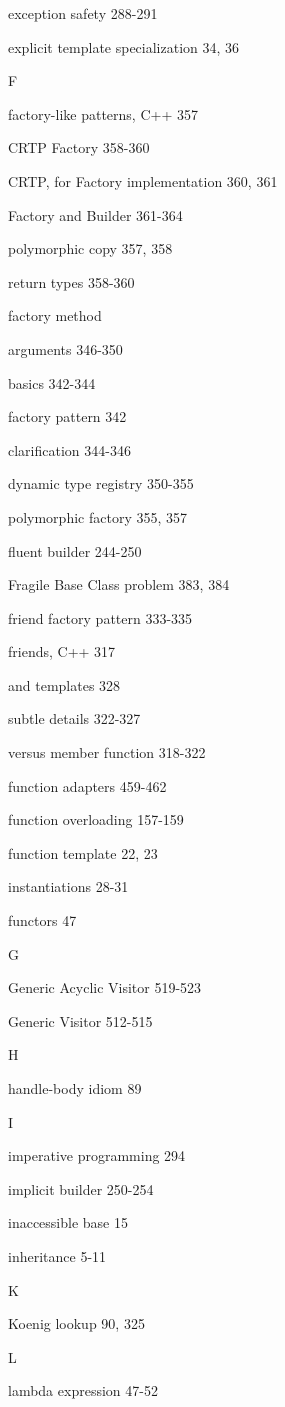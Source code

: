 exception safety 288-291

explicit template specialization 34, 36

F

factory-like patterns, C++ 357

CRTP Factory 358-360

CRTP, for Factory implementation 360, 361

Factory and Builder 361-364

polymorphic copy 357, 358

return types 358-360

factory method

arguments 346-350

basics 342-344

factory pattern 342

clarification 344-346

dynamic type registry 350-355

polymorphic factory 355, 357

fluent builder 244-250

Fragile Base Class problem 383, 384

friend factory pattern 333-335

friends, C++ 317

and templates 328

subtle details 322-327

versus member function 318-322

function adapters 459-462

function overloading 157-159

function template 22, 23

instantiations 28-31

functors 47

G

Generic Acyclic Visitor 519-523

Generic Visitor 512-515

H

handle-body idiom 89

I

imperative programming 294

implicit builder 250-254

inaccessible base 15

inheritance 5-11

K

Koenig lookup 90, 325

L

lambda expression 47-52

